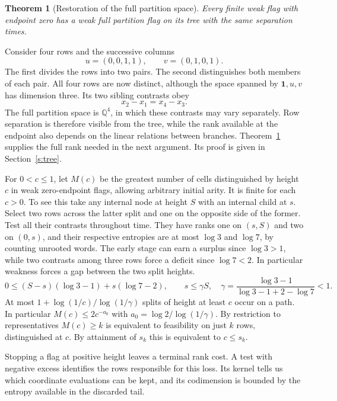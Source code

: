 \documentclass[11pt]{article}
\newtheorem{theorem}{Theorem}[section]
\numberwithin{equation}{section}
\newcommand{\Q}{\mathbb Q}
\newcommand{\one}{\mathbf 1}
\begin{document}
\begin{theorem}[Restoration of the full partition space]\label{t:restore}
Every finite weak flag with endpoint zero has a weak full partition
flag on its tree with the same separation times.
\end{theorem}

Consider four rows and the successive columns
\[
             u=(0,0,1,1),\qquad v=(0,1,0,1).
\]
The first divides the rows into two pairs. The second distinguishes
both members of each pair. All four rows are now distinct, although
the space spanned by $\one,u,v$ has dimension three. Its two sibling
contrasts obey
\begin{equation}
                  x_2-x_1=x_4-x_3 . \label{e:fourrows}
\end{equation}
The full partition space is $\Q^4$, in which these contrasts may vary
separately. Row separation is therefore visible from the tree, while
the rank available at the endpoint also depends on the linear
relations between branches. Theorem~\ref{t:restore} supplies the
full rank needed in the next argument. Its proof is given in
Section~\ref{s:tree}.

For $0<c\le1$, let $M(c)$ be the greatest number of cells distinguished by height
$c$ in weak zero-endpoint flags, allowing arbitrary initial arity.
It is finite for each $c>0$. To see this take any internal node
at height $S$ with an internal child at $s$. Select two rows
across the latter split and one on the opposite side of the former.
Test all their contrasts throughout time. They have ranks one on
$(s,S)$ and two on $(0,s)$, and their respective entropies are
at most $\log3$ and $\log7$, by counting unrooted words.
The early stage can earn a surplus since $\log3>1$, while two
contrasts among three rows force a deficit since $\log7<2$.
In particular weakness forces a gap between the two split heights.
\[
 0\le(S-s)(\log3-1)+s(\log7-2),\qquad
 s\le\gamma S,\quad
 \gamma=\frac{\log3-1}{\log3-1+2-\log7}<1 .
\]
At most $1+\log(1/c)/\log(1/\gamma)$ splits of height at least
$c$ occur on a path. In particular $M(c)\le2c^{-a_0}$ with
$a_0=\log2/\log(1/\gamma)$. By restriction to representatives
$M(c)\ge k$ is equivalent to feasibility on just $k$ rows,
distinguished at $c$. By attainment of $s_k$ this is equivalent to $c\le s_k$.

Stopping a flag at positive height leaves a terminal rank cost.
A test with negative excess identifies the rows responsible for
this loss. Its kernel tells us which coordinate evaluations can
be kept, and its codimension is bounded by the entropy available
in the discarded tail.
\end{document}
